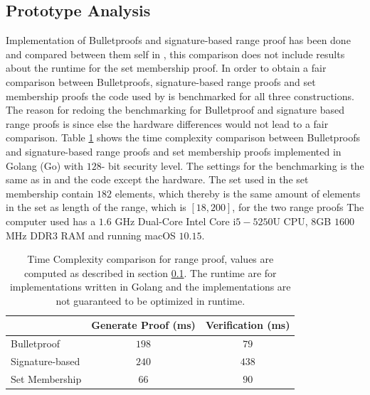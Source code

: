 \subsection{Prototype Analysis}
\label{sec:PrototypeAnalysis}
Implementation of Bulletproofs and signature-based range proof has been done  and compared between them self in \cite{RANGE-SET}, this comparison does not include results about the runtime for the set membership proof. In order to obtain a fair comparison between Bulletproofs, signature-based range proofs and set membership proofs the code used by \cite{RANGE-SET} is benchmarked for all three constructions. The reason for redoing the benchmarking for Bulletproof and signature based range proofs is since else the hardware differences would not lead to a fair comparison. Table \ref{tab:runtime} shows the time complexity comparison between Bulletproofs and signature-based range proofs and set membership proofs implemented in Golang (Go) with $128$- bit security level.  The settings for the benchmarking is the same as in \cite{RANGE-SET}  and the code \cite{Git:RP} except the hardware. The set used in the set membership contain $182$ elements, which thereby is the same amount of elements in the set as length of the range, which is $[18,200]$, for the two range proofs 
The computer used has a $1.6$ GHz Dual-Core Intel Core i$5-5250$U CPU, $8$GB $1600$ MHz DDR3 RAM  and running macOS $10.15$. 



\begin{table}
	\centering
	\caption{Time Complexity comparison for range proof, values are computed as described in section \ref{sec:PrototypeAnalysis}. The runtime are for implementations written in Golang and the implementations are not guaranteed to be optimized in runtime. }
	\label{tab:runtime}
	\begin{tabular}[t]{ l c c }
			 \toprule
    									 		&Generate Proof (ms)	&		Verification  (ms)\\ \midrule		
  			Bulletproof   				&   $ 198$   & $ 79$ 	\\
    			Signature-based 		&   $ 240 $   				&	$438$  \\
    			Set Membership 		&		$66$				&	$90$	\\
			\bottomrule		
	\end{tabular}
 \end{table}

